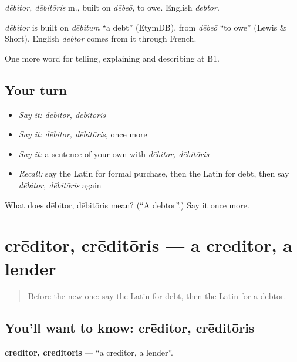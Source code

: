 \emph{dēbitor, dēbitōris} m., built on \emph{dēbeō}, to owe. English \emph{debtor}.

\begin{cousinweb}
\emph{dēbitor} is built on \emph{dēbitum} \textquotedblleft{}a debt\textquotedblright{} (EtymDB), from \emph{dēbeō} \textquotedblleft{}to owe\textquotedblright{} (Lewis \& Short). English \emph{debtor} comes from it through French.
\end{cousinweb}

\begin{grammarlens}[title={What you've built}]
One more word for telling, explaining and describing at B1.
\end{grammarlens}

\subsection*{Your turn}
\begin{itemize}
\raggedright
  \item \emph{Say it:} \emph{dēbitor, dēbitōris}
  \item \emph{Say it:} \emph{dēbitor, dēbitōris}, once more
  \item \emph{Say it:} a sentence of your own with \emph{dēbitor, dēbitōris}
  \item \emph{Recall:} say the Latin for formal purchase, then the Latin for debt, then say \emph{dēbitor, dēbitōris} again
\end{itemize}

\begin{tcolorbox}[breakable,colback=teal!4,colframe=teal!35!black,title={Before you move on}]
What does dēbitor, dēbitōris mean? (\textquotedblleft{}A debtor\textquotedblright{}.) Say it once more.
\end{tcolorbox}
\section[crēditor, crēditōris]{crēditor, crēditōris — a creditor, a lender}

\label{lesson:LA-C418-creditor}



\begin{quote}
Before the new one: say the Latin for debt, then the Latin for a debtor.
\end{quote}

\subsection*{You'll want to know: crēditor, crēditōris}
\textbf{crēditor, crēditōris} — \textquotedblleft{}a creditor, a lender\textquotedblright{}.

